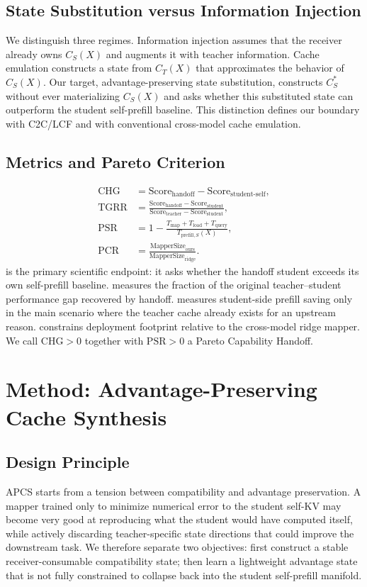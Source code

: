 \documentclass[10pt]{article}
\newcommand{\method}{APCS}
\newcommand{\chg}{\text{CHG}}
\newcommand{\tgrr}{\text{TGRR}}
\newcommand{\psr}{\text{PSR}}
\newcommand{\pcr}{\text{PCR}}
\begin{document}
\subsection{State Substitution versus Information Injection}
We distinguish three regimes. Information injection assumes that the receiver already owns
$C_S(X)$ and augments it with teacher information. Cache emulation constructs a state from
$C_T(X)$ that approximates the behavior of $C_S(X)$. Our target, advantage-preserving state
substitution, constructs $C_S^*$ without ever materializing $C_S(X)$ and asks whether this
substituted state can outperform the student self-prefill baseline. This distinction defines our
boundary with C2C/LCF and with conventional cross-model cache emulation.

\subsection{Metrics and Pareto Criterion}
\begin{align}
  \chg &= \mathrm{Score}_{\mathrm{handoff}} - \mathrm{Score}_{\mathrm{student\text{-}self}}, \\
  \tgrr &= \frac{\mathrm{Score}_{\mathrm{handoff}} - \mathrm{Score}_{\mathrm{student}}}
                 {\mathrm{Score}_{\mathrm{teacher}} - \mathrm{Score}_{\mathrm{student}}}, \\
  \psr &= 1 - \frac{T_{\mathrm{map}} + T_{\mathrm{load}} + T_{\mathrm{query}}}
                 {T_{\mathrm{prefill},S}(X)}, \\
  \pcr &= \frac{\mathrm{MapperSize}_{\mathrm{ours}}}{\mathrm{MapperSize}_{\mathrm{ridge}}}.
\end{align}
\chg{} is the primary scientific endpoint: it asks whether the handoff student exceeds its own
self-prefill baseline. \tgrr{} measures the fraction of the original teacher--student performance
gap recovered by handoff. \psr{} measures student-side prefill saving only in the main scenario
where the teacher cache already exists for an upstream reason. \pcr{} constrains deployment
footprint relative to the cross-model ridge mapper. We call $\chg>0$ together with $\psr>0$ a
Pareto Capability Handoff.

\section{Method: Advantage-Preserving Cache Synthesis}
\subsection{Design Principle}
\method{} starts from a tension between compatibility and advantage preservation. A mapper trained
only to minimize numerical error to the student self-KV may become very good at reproducing what
the student would have computed itself, while actively discarding teacher-specific state
directions that could improve the downstream task. We therefore separate two objectives: first
construct a stable receiver-consumable compatibility state; then learn a lightweight advantage
state that is not fully constrained to collapse back into the student self-prefill manifold.
\end{document}
